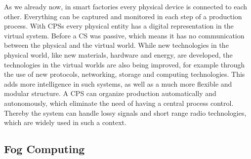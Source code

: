 As we already now, in smart factories every physical device is connected to each other.
Everything can be captured and monitored in each step of a production process.
With \acp{CPS} every physical entity has a digital representation in the virtual system.\cite[cf.][p. 1363]{Poovendran:2010}
Before a \ac{CS} was passive, which means it has no communication between the physical and the virtual world.\cite[cf.][p. 1364]{Poovendran:2010}
While new technologies in the physical world, like new materials, hardware and energy, are developed, the technologies in the virtual worlds are also being improved, for example through the use of new protocols, networking, storage and computing technologies.\cite[cf.][p. 1364]{Poovendran:2010}
This adds more intelligence in such systems, as well as a much more flexible and modular structure.
A \ac{CPS} can organize production automatically and autonomously, which eliminate the need of having a central process control.\cite[cf.]{Lom}
Thereby the system can handle lossy signals and short range radio technologies, which are widely used in such a context.\cite[cf.]{Yannuzzi2014}


\subsection{Fog Computing}


